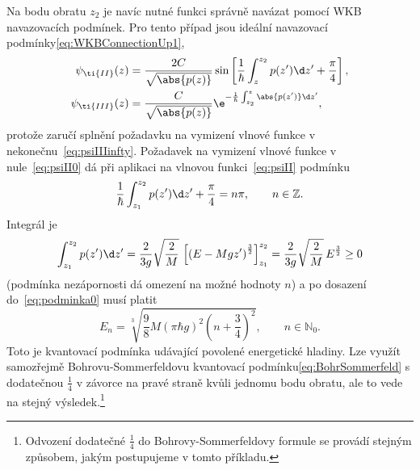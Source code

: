 \begin{solution}
\begin{enumerate}
\begin{itemize}
                    Na bodu obratu $z_{2}$ je navíc nutné funkci správně navázat pomocí WKB navazovacích podmínek.
                    Pro tento případ jsou ideální navazovací podmínky\eqref{eq:WKBConnectionUp1},
                    \begin{align}
                        \label{eq:psiII}
                        \psi_{\ti{II}}(z)
                            &=\frac{2C}{\sqrt{\abs{p(z)}}}\sin\left[\frac{1}{\hbar}\int_{z}^{z_{2}}p(z')\d z'+\frac{\pi}{4}\right],\\
                        \psi_{\ti{III}}(z)
                            &=\frac{C}{\sqrt{\abs{p(z)}}}\e^{-\frac{1}{\hbar}\int_{z_{2}}^{z}\abs{p(z')}\d z'},
                    \end{align}
                    protože zaručí splnění požadavku na vymizení vlnové funkce v nekonečnu~\eqref{eq:psiIIIinfty}.
                    Požadavek na vymizení vlnové funkce v nule~\eqref{eq:psiII0} dá při aplikaci na vlnovou funkci~\eqref{eq:psiII} podmínku
                    \begin{equation}
                        \label{eq:podminka0}
                        \frac{1}{\hbar}\int_{z_{1}}^{z_{2}}p(z')\d z'+\frac{\pi}{4}=n\pi,\qquad n\in\mathbb{Z}.
                    \end{equation}
                    Integrál je
                    \begin{equation}
                        \int_{z_{1}}^{z_{2}}p(z')\d z'
                            =\frac{2}{3g}\sqrt{\frac{2}{M}}\,\left[\left(E-Mgz'\right)^{\frac{3}{2}}\right]_{z_{1}}^{z_{2}}
                            =\frac{2}{3g}\sqrt{\frac{2}{M}}\,E^{\frac{3}{2}}\geq0
                    \end{equation}
                    (podmínka nezápornosti dá omezení na možné hodnoty $n$) a po dosazení do~\eqref{eq:podminka0} musí platit
                    \begin{equation}
                        \boxed{E_{n}=\sqrt[3]{\frac{9}{8}M\left(\pi\hbar g\right)^{2}\left(n+\frac{3}{4}\right)^{2}},\qquad n\in\mathbb{N}_{0}}.
                    \end{equation}
                    Toto je kvantovací podmínka udávající povolené energetické hladiny.
                    Lze využít samozřejmě Bohrovu-Sommerfeldovu kvantovací podmínku\eqref{eq:BohrSommerfeld} s do\-da\-teč\-nou $\frac{1}{4}$ v závorce na pravé straně kvůli jednomu  bodu obratu, ale to vede na stejný výsledek.\footnote{
                        Odvození dodatečné $\frac{1}{4}$ do Bohrovy-Sommerfeldovy formule se provádí stejným způsobem, jakým postupujeme v tomto příkladu. 
                    }


\end{itemize}
\end{enumerate}
\end{solution}
